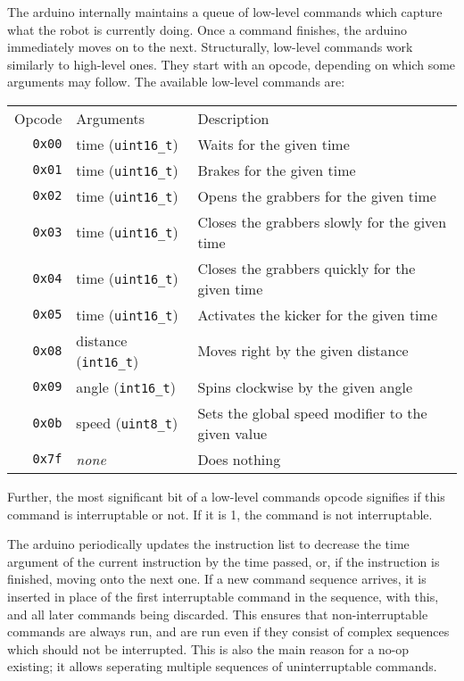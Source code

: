 \documentclass[a4paper]{scrartcl}
\begin{document}
The arduino internally maintains a queue of low-level commands which capture
what the robot is currently doing. Once a command finishes, the arduino
immediately moves on to the next. Structurally, low-level commands work
similarly to high-level ones. They start with an opcode, depending on which
some arguments may follow. The available low-level commands are:

\begin{tabularx}{\textwidth}{rlX}
    Opcode & Arguments & Description \\
    \texttt{0x00} & time (\verb$uint16_t$) &
        Waits for the given time \\
    \texttt{0x01} & time (\verb$uint16_t$) &
        Brakes for the given time \\
    \texttt{0x02} & time (\verb$uint16_t$) &
        Opens the grabbers for the given time \\
    \texttt{0x03} & time (\verb$uint16_t$) &
        Closes the grabbers slowly for the given time \\
    \texttt{0x04} & time (\verb$uint16_t$) &
        Closes the grabbers quickly for the given time \\
    \texttt{0x05} & time (\verb$uint16_t$) &
        Activates the kicker for the given time \\
    \texttt{0x08} & distance (\verb$int16_t$) &
        Moves right by the given distance \\
    \texttt{0x09} & angle (\verb$int16_t$) &
        Spins clockwise by the given angle \\
    \texttt{0x0b} & speed (\verb$uint8_t$) &
        Sets the global speed modifier to the given value \\
    \texttt{0x7f} & \textit{none} & Does nothing \\
\end{tabularx}

Further, the most significant bit of a low-level commands opcode signifies if this command is interruptable or not. If it is 1, the command is not interruptable.

The arduino periodically updates the instruction list to decrease the time
argument of the current instruction by the time passed, or, if the instruction
is finished, moving onto the next one. If a new command sequence arrives, it is
inserted in place of the first interruptable command in the sequence, with
this, and all later commands being discarded. This ensures that
non-interruptable commands are always run, and are run even if they consist of
complex sequences which should not be interrupted. This is also the main reason
for a no-op existing; it allows seperating multiple sequences of
uninterruptable commands.
\end{document}
